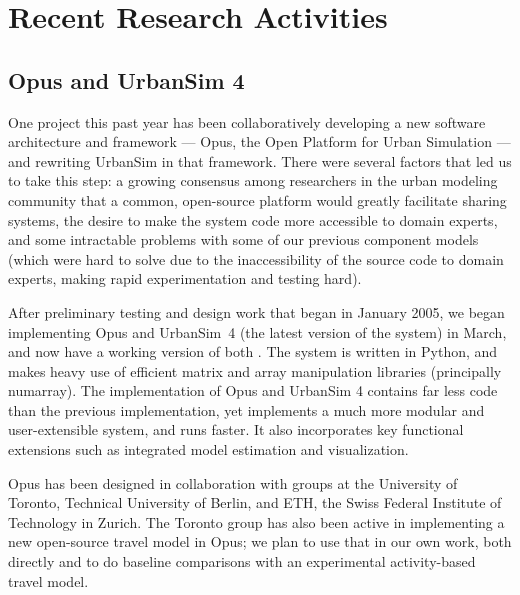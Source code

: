 \documentclass{acm_proc_article-sp}
\begin{document}
\section{Recent Research Activities}

\subsection{Opus and UrbanSim 4}
\label{opus}

One project this past year has been collaboratively
developing a new software architecture and framework --- Opus, the Open
Platform for Urban Simulation --- and rewriting UrbanSim in that framework.
There were several factors that led us to take this step: a growing
consensus among researchers in the urban modeling community that a common,
open-source platform would greatly facilitate sharing systems,
the desire to make the system code more accessible to domain experts, and
some intractable problems with some of our previous component models (which
were hard to solve due to the inaccessibility of the source code to domain
experts, making rapid experimentation and testing hard).

After preliminary testing and design work that began in January
2005, we began implementing Opus and UrbanSim~4 (the latest
version of the system) in March, and now have a working version of
both \cite{waddell-opus-2005}. The system is written in Python,
and makes heavy use of efficient matrix and array manipulation
libraries (principally numarray).  The implementation of Opus and
UrbanSim 4 contains far less code than the previous
implementation, yet implements a much more modular and
user-extensible system, and runs faster.  It also incorporates key
functional extensions such as integrated model estimation and
visualization.

Opus has been designed in collaboration with groups at the
University of Toronto, Technical University of Berlin, and ETH,
the Swiss Federal Institute of Technology in Zurich. The Toronto
group has also been active in implementing a new open-source travel
model in Opus; we plan to use that in our own work,
both directly and to do baseline comparisons with an experimental
activity-based travel model.

%
\end{document}
